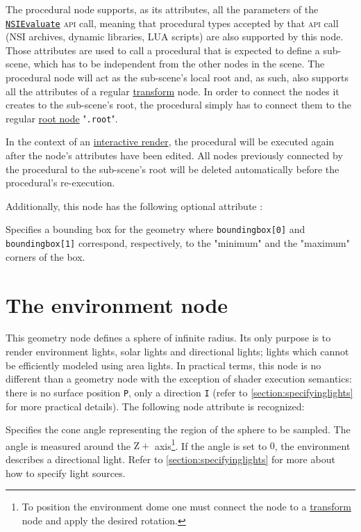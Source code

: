 \documentclass[oneside,ebook]{memoir}
\newcommand*{\acronym}[1]{\textsc{\lowercase{#1}}}
\newcommand{\paramlistitemTN}[2]{\item[#2\textcolor{lightgray}{\dotfill}#1]}
\newcommand{\paramlistitemTND}[3]{\paramlistitemTN{#1 {\rmfamily({\ttfamily#3})}}{#2}}
\begin{document}
The procedural node supports, as its attributes, all the parameters of the \hyperref[CAPI:nsievaluate]{\lstinline|NSIEvaluate|} \acronym{API} call, meaning that procedural types accepted by that \acronym{API} call (NSI archives, dynamic libraries, LUA scripts) are also supported by this node.
Those attributes are used to call a procedural that is expected to define a sub-scene, which has to be independent from the other nodes in the scene.
The procedural node will act as the sub-scene's local root and, as such, also supports all the attributes of a regular \hyperref[section:transform]{transform} node.
In order to connect the nodes it creates to the sub-scene's root, the procedural simply has to connect them to the regular \hyperref[section:rootnode]{root node} "\lstinline|.root|".

In the context of an \hyperref[interactive render]{interactive render}, the procedural will be executed again after the node's attributes have been edited.
All nodes previously connected by the procedural to the sub-scene's root will be deleted automatically before the procedural's re-execution.

Additionally, this node has the following optional attribute :
\begin{paramlist}
\paramlistitemTN{point\lbrack{}2\rbrack}{boundingbox}
Specifies a bounding box for the geometry where \lstinline|boundingbox[0]| and \lstinline|boundingbox[1]| correspond, respectively, to the "minimum" and the "maximum" corners of the box.
\end{paramlist}

\section{The environment node}
\label{section:environmentnode}
This geometry node defines a sphere of infinite radius.
Its only purpose is to render environment lights, solar lights and directional lights; lights which cannot be efficiently modeled using area lights.
In practical terms, this node is no different than a geometry node with the exception of shader execution semantics: there is no surface position \lstinline|P|, only a direction \lstinline|I| (refer to \autoref{section:specifyinglights} for more practical details).
The following node attribute is recognized:
\begin{paramlist}
\paramlistitemTND{double}{angle}{360}
Specifies the cone angle representing the region of the sphere to be sampled. The angle is measured around the \(\mathrm{Z+}\) axis\footnote{To position the environment dome one must connect the node to a \hyperref[section:transformnode]{transform} node and apply the desired rotation.}. If the angle is set to \(0\), the environment describes a directional light. Refer to \autoref{section:specifyinglights} for more about how to specify light sources.
\end{paramlist}
\end{document}
